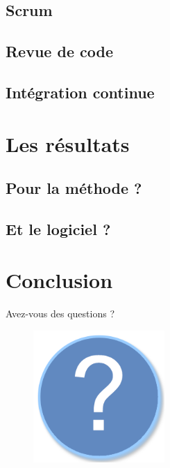 \documentclass{beamer}
\begin{document}
\subsection{Scrum}
\begin{frame}
	
\end{frame}
\subsection{Revue de code}
\begin{frame}
\end{frame}
\subsection{Intégration continue}
\begin{frame}
\end{frame}
\section{Les résultats}
\subsection{Pour la méthode ?}
\begin{frame}
\end{frame}

\subsection{Et le logiciel ?}
\begin{frame}
\end{frame}

\section*{Conclusion}
\begin{frame}
	
\end{frame}

\begin{frame}{Avez-vous des questions ?}
	\begin{figure}[H]
		\centering
		\includegraphics[width=5cm]{interrogation.png}
	\end{figure}
\end{frame}
\end{document}
